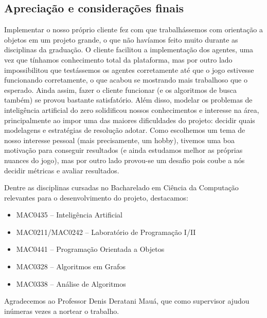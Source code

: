 \subsection{Apreciação e considerações finais}
Implementar o nosso próprio cliente fez com que trabalhássemos com orientação a objetos em um projeto grande, o que não havíamos feito muito durante as disciplinas da graduação. O cliente facilitou a implementação dos agentes, uma vez que tínhamos conhecimento total da plataforma, mas por outro lado impossibilitou que testássemos os agentes corretamente até que o jogo estivesse funcionando corretamente, o que acabou se mostrando mais trabalhoso que o esperado. Ainda assim, fazer o cliente funcionar (e os algoritmos de busca também) se provou bastante satisfatório. Além disso, modelar os problemas de inteligência artificial do zero solidificou nossos conhecimentos e interesse na área, principalmente ao impor uma das maiores dificuldades do projeto: decidir quais modelagens e estratégias de resolução adotar. Como escolhemos um tema de nosso interesse pessoal (mais precisamente, um hobby), tivemos uma boa motivação para conseguir resultados (e ainda estudamos melhor as próprias nuances do jogo), mas por outro lado provou-se um desafio pois coube a nós decidir métricas e avaliar resultados.

Dentre as disciplinas cursadas no Bacharelado em Ciência da Computação relevantes para o desenvolvimento do projeto, destacamos:
\begin{itemize}
\item MAC0435 -- Inteligência Artificial
\item MAC0211/MAC0242 -- Laboratório de Programação I/II
\item MAC0441 -- Programação Orientada a Objetos
\item MAC0328 -- Algoritmos em Grafos
\item MAC0338 -- Análise de Algoritmos
\end{itemize}
Agradecemos ao Professor Denis Deratani Mauá, que como supervisor ajudou inúmeras vezes a nortear o
trabalho.
